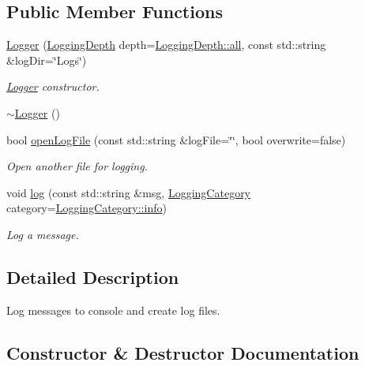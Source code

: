 \subsection*{Public Member Functions}
\begin{DoxyCompactItemize}
\item 
\mbox{\hyperlink{classec_1_1_logger_a64b616307b97bab0181814a5f9258e9f}{Logger}} (\mbox{\hyperlink{namespaceec_a4b0151aefd16631c24dd6464fd331e4b}{Logging\+Depth}} depth=\mbox{\hyperlink{namespaceec_a4b0151aefd16631c24dd6464fd331e4baa181a603769c1f98ad927e7367c7aa51}{Logging\+Depth\+::all}}, const std\+::string \&log\+Dir=\char`\"{}Logs\char`\"{})
\begin{DoxyCompactList}\small\item\em \mbox{\hyperlink{classec_1_1_logger}{Logger}} constructor. \end{DoxyCompactList}\item 
\mbox{\hyperlink{classec_1_1_logger_acc4668ba16f1368b352237df41af79d5}{$\sim$\+Logger}} ()
\item 
bool \mbox{\hyperlink{classec_1_1_logger_aaa61f62bc64a30b72c9a0c8cd8d61102}{open\+Log\+File}} (const std\+::string \&log\+File=\char`\"{}\char`\"{}, bool overwrite=false)
\begin{DoxyCompactList}\small\item\em Open another file for logging. \end{DoxyCompactList}\item 
void \mbox{\hyperlink{classec_1_1_logger_a9d90ffbfc32f3f6f56c9c3eaf50ee81d}{log}} (const std\+::string \&msg, \mbox{\hyperlink{namespaceec_a67e511e8b22e1051ea392cb2f68315d8}{Logging\+Category}} category=\mbox{\hyperlink{namespaceec_a67e511e8b22e1051ea392cb2f68315d8acaf9b6b99962bf5c2264824231d7a40c}{Logging\+Category\+::info}})
\begin{DoxyCompactList}\small\item\em Log a message. \end{DoxyCompactList}\end{DoxyCompactItemize}


\subsection{Detailed Description}
Log messages to console and create log files. 

\subsection{Constructor \& Destructor Documentation}
\mbox{\label{classec_1_1_logger_a64b616307b97bab0181814a5f9258e9f}} 

